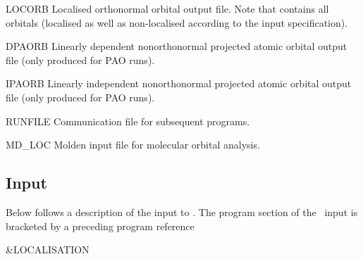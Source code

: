 \begin{filelist}
\item[LOCORB]
Localised orthonormal orbital output file.
Note that  contains all orbitals (localised as well as non-localised
according to the input specification).
\item[DPAORB]
Linearly dependent nonorthonormal projected atomic orbital output file
(only produced for PAO runs).
\item[IPAORB]
Linearly independent nonorthonormal projected atomic orbital output file
(only produced for PAO runs).
\item[RUNFILE]
Communication file for subsequent programs.
\item[MD\_LOC]
Molden input file for molecular orbital analysis.
\end{filelist}

\subsection{Input}
\label{UG:sec:scf_inploc}

Below follows a description of the input to .
The  program section of the \molcas\ input is bracketed by
a preceding program reference
\begin{inputlisting}
 &LOCALISATION
\end{inputlisting}


